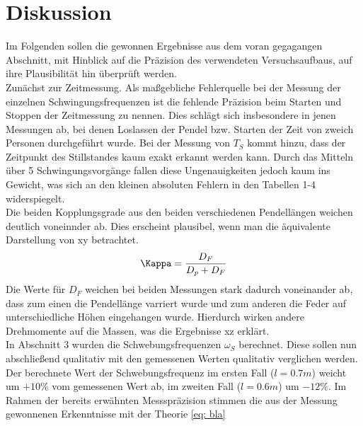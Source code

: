 \section{Diskussion}
Im Folgenden sollen die gewonnen Ergebnisse aus dem voran gegagangen Abschnitt, mit Hinblick auf die Präzision
des verwendeten Versuchsaufbaus, auf ihre Plausibilität hin überprüft werden.\\
Zunächst zur Zeitmessung. Als maßgebliche Fehlerquelle bei der Messung der einzelnen Schwingungsfrequenzen ist die
fehlende Präzision beim Starten und Stoppen der Zeitmessung zu nennen. Dies schlägt sich
insbesondere in jenen Messungen ab, bei denen Loslassen der Pendel bzw. Starten der Zeit
von zweich Personen durchgeführt wurde. Bei der Messung von $T_{S}$ kommt hinzu, dass
der Zeitpunkt des Stillstandes kaum exakt erkannt werden kann. Durch das Mitteln über
5 Schwingungsvorgänge fallen diese Ungenauigkeiten jedoch kaum ins Gewicht, was sich an
den kleinen absoluten Fehlern in den Tabellen 1-4 widerspiegelt. \\
Die beiden Kopplungsgrade aus den beiden verschiedenen Pendellängen weichen deutlich
voneinnder ab. Dies erscheint plausibel, wenn man die äquivalente Darstellung von xy
betrachtet.
\begin{equation*}
  \Kappa = \frac{D_F}{D_p + D_F}
\end{equation*}
Die Werte für $D_F$ weichen bei beiden Messungen stark dadurch voneinander ab, dass
zum einen die Pendellänge varriert wurde und zum anderen die Feder auf unterschiedliche
Höhen eingehangen wurde. Hierdurch wirken andere Drehmomente auf die Massen, was die
Ergebnisse xz erklärt. \\
In Abschnitt 3 wurden die Schwebungsfrequenzen $\omega_{S}$ berechnet. Diese sollen nun
abschließend qualitativ mit den gemessenen Werten qualitativ verglichen werden. Der berechnete
Wert der Schwebungsfrequenz im ersten Fall ($l = 0.7 m$) weicht um $+ 10 \%$ vom gemessenen Wert
ab, im zweiten Fall ($l = 0.6 m$) um $-12\%$. Im Rahmen der bereits erwähnten Messspräzision
stimmen die aus der Messung gewonnenen Erkenntnisse mit der Theorie \ref{eq: bla}
